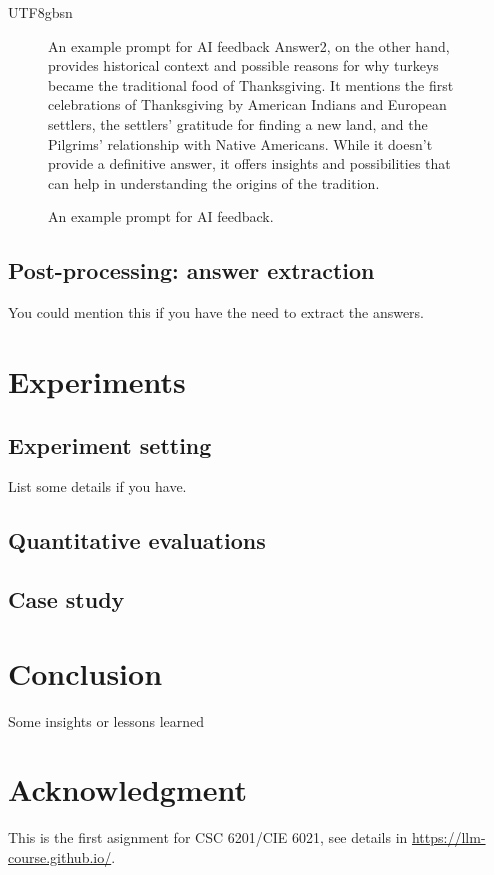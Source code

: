 \documentclass{article}%
\begin{document}
\begin{CJK}{UTF8}{gbsn}
\begin{figure}[t]
\begin{AIbox}{An example prompt for  AI feedback}
{Answer2, on the other hand, provides historical context and possible reasons for why turkeys became the traditional food of Thanksgiving. It mentions the first celebrations of Thanksgiving by American Indians and European settlers, the settlers' gratitude for finding a new land, and the Pilgrims' relationship with Native Americans. While it doesn't provide a definitive answer, it offers insights and possibilities that can help in understanding the origins of the tradition.   \\
}
\end{AIbox} 
\caption{An example prompt for  AI feedback.}
\end{figure}


\subsection{Post-processing: answer extraction}


You could mention this if you have the need to extract the answers.

\section{Experiments}
\subsection{Experiment setting}
List some details if you have.

\subsection{Quantitative evaluations}

\lipsum[2]

\subsection{Case study}

\lipsum[3]

\section{Conclusion}

Some insights or lessons learned






\newpage
\section*{Acknowledgment}

This is the first asignment  for CSC 6201/CIE 6021, see details in \url{https://llm-course.github.io/}.






\end{CJK}
\end{document}
